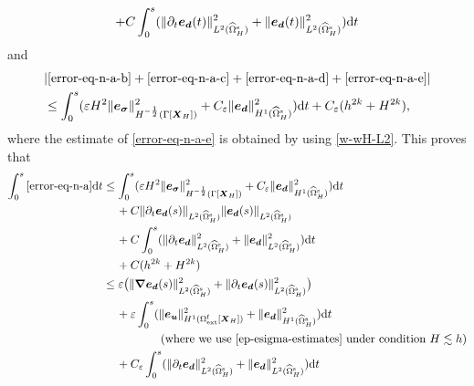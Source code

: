 \documentclass[11pt,reqno]{amsart}
\theoremstyle{definition}
\theoremstyle{plain}
\numberwithin{theorem}{section}
\numberwithin{proposition}{section}
\numberwithin{lemma}{section}
\numberwithin{equation}{section}
\newcommand{\bs}[1]{\boldsymbol{#1}}
\newcommand{\uu}[1]  {{\bs{#1}} }
\newcommand{\dep}{{{\bs{d}}}}
\newcommand{\grad}   { \uu{\nabla}    }
\def\d{\mathrm{d}}
\renewcommand{\(}{\bigl(}
\renewcommand{\)}{\bigr)}
\begin{document}
\begin{itemize}[leftmargin=20pt]
\begin{align}
+ C\int_0^s (\|\partial_t{\bs e}_{\dep}(t)\|_{L^2(\widehat{\Omega}^{\rm s}_H)}^2 + \|{\bs e}_{\dep}(t)\|_{L^2(\widehat{\Omega}^{\rm s}_H)}^2) \d t 
\end{align}
and
\begin{align}
&|\eqref{error-eq-n-a-b}+\eqref{error-eq-n-a-c}+\eqref{error-eq-n-a-d}+\eqref{error-eq-n-a-e}| \notag\\ 
&\le  \int_0^s (\varepsilon H^2\|{\bs e}_{\bs\sigma}\|_{H^{-\frac12}(\Gamma[{\bs X}_H])}^2
+ C_{\varepsilon}\|{\bs e}_{\dep}\|_{H^1(\widehat{\Omega}^{\rm s}_H)}^2 ) \d t + C_{\varepsilon}(h^{2k}+H^{2k}), 
\end{align}
where the estimate of \eqref{error-eq-n-a-e} is obtained by using \eqref{w-wH-L2}. 
This proves that 
\begin{subequations} \label{error-eq-n-abcd-estimate}
\begin{align}\label{error-eq-n-a-estimate}
\int_0^s \eqref{error-eq-n-a} \d t
&\le \int_0^s (\varepsilon H^2\|{\bs e}_{\bs\sigma}\|_{H^{-\frac12}(\Gamma[{\bs X}_H])}^2
+ C_{\varepsilon}\|{\bs e}_{\dep}\|_{H^1(\widehat{\Omega}^{\rm s}_H)}^2) \d t \notag\\
&\quad\, 
+C\|\partial_t{\bs e}_{\dep}(s)\|_{L^2(\widehat{\Omega}^{\rm s}_H)}  \|{\bs e}_{\dep}(s)\|_{L^2(\widehat{\Omega}^{\rm s}_H)} \notag\\
&\quad\, 
+ C\int_0^s (\|\partial_t{\bs e}_{\dep}\|_{L^2(\widehat{\Omega}^{\rm s}_H)}^2 + \|{\bs e}_{\dep}\|_{L^2(\widehat{\Omega}^{\rm s}_H)}^2) \d t \notag\\
&\quad\, + C(h^{2k}+H^{2k}) \notag\\ 
&\le 
\varepsilon
\big( \|\grad{\bs e}_{\bs d}(s)\|_{L^2(\widehat\Omega^{\rm s}_H)}^2 + \|\partial_t{\bs e}_{\bs d}(s)\|_{L^2(\widehat\Omega^{\rm s}_H)}^2 \big) \notag\\
&\quad\, + \varepsilon \int_0^s ( \|{\bs e}_{\bs u}\|_{H^1(\Omega^{\rm f}_{\rm ext}[{\bs X}_H])}^2 + \|{\bs e}_\dep\|_{H^1(\widehat{\Omega}^{\rm s}_H)}^2 ) \d t \notag\\
&\hspace{50pt}\mbox{(where we use \eqref{ep-esigma-estimates} under condition $H\lesssim h$)} \notag\\
&\quad\, 
+ C_\varepsilon \int_0^s (\|\partial_t{\bs e}_{\dep}\|_{L^2(\widehat{\Omega}^{\rm s}_H)}^2 + \|{\bs e}_{\dep}\|_{L^2(\widehat{\Omega}^{\rm s}_H)}^2) \d t \notag\\

\end{align}
\end{subequations}
\end{itemize}
\end{document}
